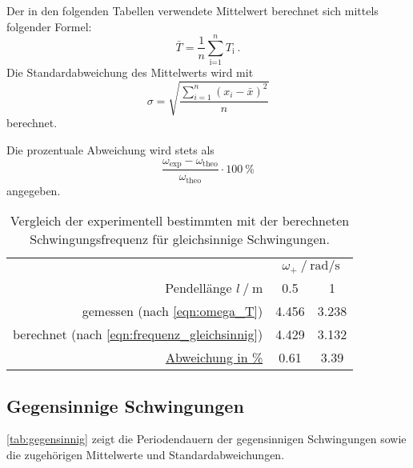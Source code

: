 Der in den folgenden Tabellen verwendete Mittelwert berechnet sich mittels folgender Formel:
\begin{equation}
    \bar{T}=\frac{1}{n}\sum_{\textrm{i=1}}^n T_\textrm{i} \ .
    \label{eqn:mittelwert}
\end{equation}
Die Standardabweichung des Mittelwerts wird mit
\begin{equation}
    \sigma = \sqrt{\frac{\sum_{i=1}^{n}(x_i-\bar{x})^2}{n}}
    \label{eqn:standardabweichung}
\end{equation}
berechnet.

Die prozentuale Abweichung wird stets als
\begin{equation}
  \frac{\omega_\text{exp} - \omega_\text{theo}}{\omega_\text{theo}} \cdot \SI{100}{\percent}
  \label{eqn:abweichung_prozent}
\end{equation}
angegeben.

\begin{table}
    \centering
    \caption{Vergleich der experimentell bestimmten mit der berechneten Schwingungsfrequenz für gleichsinnige Schwingungen.}
    \label{tab:omega_gleichsinnig}
    \begin{tabular}{r S S}
        \toprule
        &  \\
        \cmidrule(lr){2-3}
        Pendellänge $l \mathbin{/} \si{\meter}$ &
        0.5 &
        1 \\
        \midrule
        gemessen (nach \autoref{eqn:omega_T}) & 4.456 & 3.238 \\
        berechnet (nach \autoref{eqn:frequenz_gleichsinnig}) & 4.429 & 3.132 \\
        \midrule
        \hyperref[eqn:abweichung_prozent]{Abweichung in \%} & 0.61 & 3.39 \\
        \bottomrule
    \end{tabular}
\end{table}


\subsection{Gegensinnige Schwingungen}
\label{sec:auswertung:gegensinnig}

\autoref{tab:gegensinnig} zeigt die Periodendauern der gegensinnigen Schwingungen
sowie die zugehörigen Mittelwerte und Standardabweichungen.

